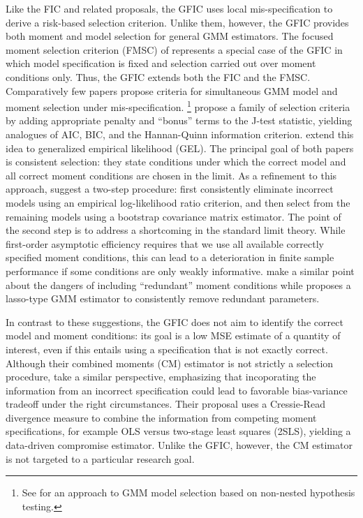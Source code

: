Like the FIC and related proposals, the GFIC uses local mis-specification to derive a risk-based selection criterion.
Unlike them, however, the GFIC provides both moment and model selection for general GMM estimators. 
The focused moment selection criterion (FMSC) of \cite{DiTraglia2012} represents a special case of the GFIC in which model specification is fixed and selection carried out over moment conditions only. 
Thus, the GFIC extends both the FIC and the FMSC.
Comparatively few papers propose criteria for simultaneous GMM model and moment selection under mis-specification.
\footnote{See \cite{Smith1992} for an approach to GMM model selection based on non-nested hypothesis testing.} \cite{AndrewsLu} propose a family of selection criteria by adding appropriate penalty and ``bonus'' terms to the J-test statistic, yielding analogues of AIC, BIC, and the Hannan-Quinn information criterion.
\cite{HongPrestonShum} extend this idea to generalized empirical likelihood (GEL). 
The principal goal of both papers is consistent selection: they state conditions under which the correct model and all correct moment conditions are chosen in the limit. 
As a refinement to this approach, \cite{LaiSmallLiu} suggest a two-step procedure: first consistently eliminate incorrect models using an empirical log-likelihood ratio criterion, and then select from the remaining models using a bootstrap covariance matrix estimator. 
The point of the second step is to address a shortcoming in the standard limit theory. 
While first-order asymptotic efficiency requires that we use all available correctly specified moment conditions, this can lead to a deterioration in finite sample performance if some conditions are only weakly informative.
\cite{HallPeixe2003} make a similar point about the dangers of including ``redundant'' moment conditions while \cite{Caner2009} proposes a lasso-type GMM estimator to consistently remove redundant parameters.


In contrast to these suggestions, the GFIC does not aim to identify the correct model and moment conditions: its goal is a low MSE estimate of a quantity of interest, even if this entails using a specification that is not exactly correct.  
Although their combined moments (CM) estimator is not strictly a selection procedure, \cite{JudgeMittelhammer} take a similar perspective, emphasizing that incoporating the information from an incorrect specification could lead to favorable bias-variance tradeoff under the right circumstances. 
Their proposal uses a Cressie-Read divergence measure to combine the information from competing moment specifications, for example OLS versus two-stage least squares (2SLS), yielding a data-driven compromise estimator. 
Unlike the GFIC, however, the CM estimator is not targeted to a particular research goal.

